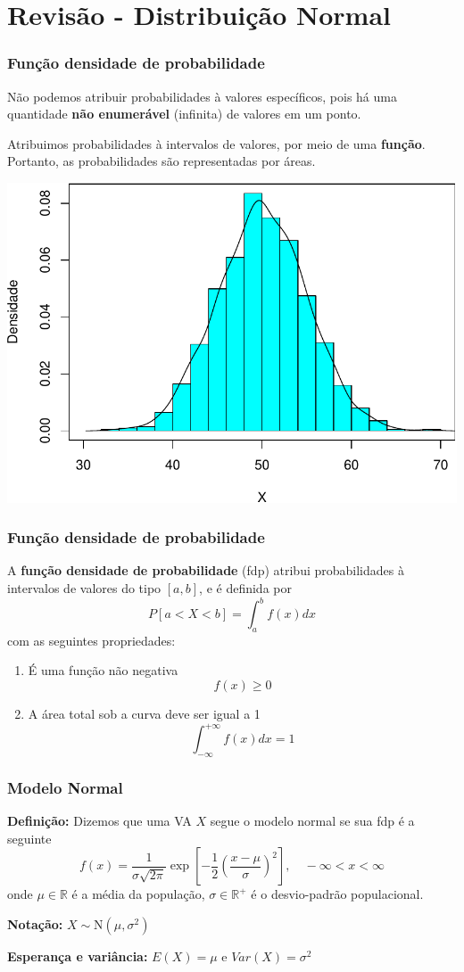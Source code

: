\documentclass[11pt]{beamer}
\begin{document}
\section{Revisão - Distribuição Normal}
\begin{frame}
\frametitle{Função densidade de probabilidade}

Não podemos atribuir probabilidades à valores específicos, pois há uma
quantidade \textbf{não enumerável} (infinita) de valores em um ponto.

Atribuimos probabilidades à intervalos de valores, por meio de uma
\textbf{função}. Portanto, as probabilidades são representadas por
áreas.


\begin{center}\includegraphics[width=0.55\linewidth]{figs/dens-1} \end{center}
\end{frame}

\begin{frame}
\frametitle{Função densidade de probabilidade}

A \textbf{função densidade de probabilidade} (fdp) atribui
probabilidades à intervalos de valores do tipo \([a,b]\), e é definida
por \[
P[a < X < b] = \int_{a}^{b} f(x) dx
\] com as seguintes propriedades:

\begin{enumerate}
\def\labelenumi{\roman{enumi}.}
\item
  É uma função não negativa \[f(x) \geq 0\]
\item
  A área total sob a curva deve ser igual a 1
  \[\int_{-\infty}^{+\infty} f(x) dx = 1\]
\end{enumerate}
\end{frame}

\begin{frame}
\frametitle{Modelo Normal}

\textbf{Definição:} Dizemos que uma VA \(X\) segue o modelo normal se
sua fdp é a seguinte \[
f(x) = \frac{1}{\sigma\sqrt{2\pi}} \exp\left[-\frac{1}{2} \left( \frac{x -
\mu}{\sigma}\right)^2\right], \quad -\infty < x < \infty
\] onde \(\mu \in \mathbb{R}\) é a média da população,
\(\sigma \in \mathbb{R}^+\) é o desvio-padrão populacional.

\textbf{Notação:} \(X \sim \text{N}(\mu, \sigma^2)\)

\textbf{Esperança e variância:} \(E(X) = \mu\) e \(Var(X) = \sigma^2\)
\end{frame}
\end{document}
